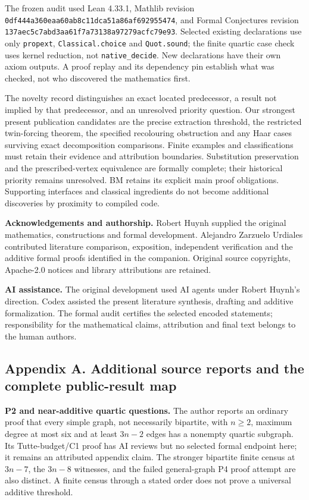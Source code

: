 \documentclass[
  11pt,
]{article}
\newcounter{none} %
\begin{document}
The frozen audit used Lean 4.33.1, Mathlib revision
\texttt{0df444a360eaa60ab8c11dca51a86af692955474}, and Formal
Conjectures revision \texttt{137aec5c7abd3aa61f7a73138a97279acfc79e93}.
Selected existing declarations use only \texttt{propext},
\texttt{Classical.choice} and \texttt{Quot.sound}; the finite quartic
case check uses kernel reduction, not \texttt{native\_decide}. New
declarations have their own axiom outputs. A proof replay and its
dependency pin establish what was checked, not who discovered the
mathematics first.

The novelty record distinguishes an exact located predecessor, a result
not implied by that predecessor, and an unresolved priority question.
Our strongest present publication candidates are the precise extraction
threshold, the restricted twin-forcing theorem, the specified
recolouring obstruction and any Haar cases surviving exact decomposition
comparisons. Finite examples and classifications must retain their
evidence and attribution boundaries. Substitution preservation and the
prescribed-vertex equivalence are formally complete; their historical
priority remains unresolved. BM retains its explicit main proof
obligations. Supporting interfaces and classical ingredients do not
become additional discoveries by proximity to compiled code.

\textbf{Acknowledgements and authorship.} Robert Huynh supplied the
original mathematics, constructions and formal development. Alejandro
Zarzuelo Urdiales contributed literature comparison, exposition,
independent verification and the additive formal proofs identified in
the companion. Original source copyrights, Apache-2.0 notices and
library attributions are retained.

\textbf{AI assistance.} The original development used AI agents under
Robert Huynh's direction. Codex assisted the present literature
synthesis, drafting and additive formalization. The formal audit
certifies the selected encoded statements; responsibility for the
mathematical claims, attribution and final text belongs to the human
authors.

\subsection{Appendix A. Additional source reports and the complete
public-result
map}\label{appendix-a.-additional-source-reports-and-the-complete-public-result-map}

\textbf{P2 and near-additive quartic questions.} The author reports an
ordinary proof that every simple graph, not necessarily bipartite, with
\(n\ge2\), maximum degree at most six and at least \(3n-2\) edges has a
nonempty quartic subgraph. Its Tutte-budget/C1 proof has AI reviews but
no selected formal endpoint here; it remains an attributed appendix
claim. The stronger bipartite finite census at \(3n-7\), the \(3n-8\)
witnesses, and the failed general-graph P4 proof attempt are also
distinct. A finite census through a stated order does not prove a
universal additive threshold.
\end{document}
